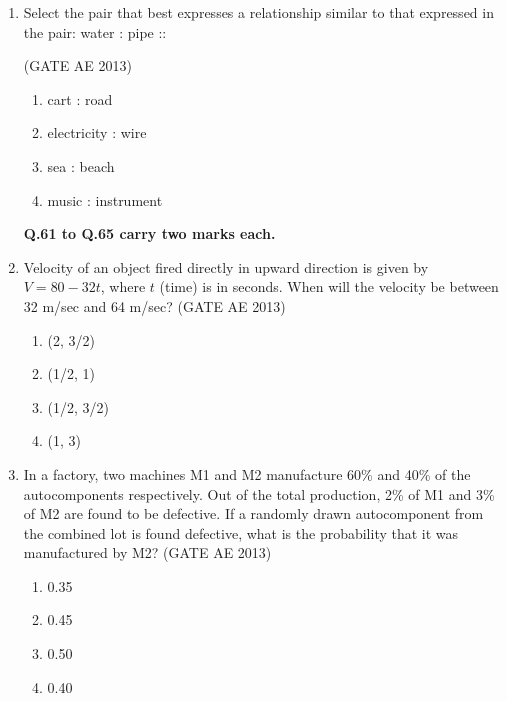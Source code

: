 \documentclass[journal,12pt,onecolumn]{IEEEtran}
\theoremstyle{remark}
\begin{document}
\begin{flushleft}
\begin{enumerate}
Which of the above underlined parts of the sentence is not appropriate? \hfill(GATE AE 2013)
\begin{multicols}{2}
\begin{enumerate}
\item I
\item II
\item III
\item IV
\end{enumerate}
\end{multicols}

\item Select the pair that best expresses a relationship similar to that expressed in the pair: 
\hspace{1cm} water : pipe ::

\hfill(GATE AE 2013)
\begin{multicols}{2}
\begin{enumerate}
\item cart : road
\item electricity : wire
\item sea : beach
\item music : instrument
\end{enumerate}
\end{multicols}

\textbf{Q.61 to Q.65 carry two marks each.}

\item Velocity of an object fired directly in upward direction is given by $V = 80 - 32t$, where $t$ (time) is in seconds. When will the velocity be between 32 m/sec and 64 m/sec? \hfill(GATE AE 2013)
\begin{multicols}{2}
\begin{enumerate}
\item (2, 3/2)
\item (1/2, 1)
\item (1/2, 3/2)
\item (1, 3)
\end{enumerate}
\end{multicols}

\item In a factory, two machines M1 and M2 manufacture 60\% and 40\% of the autocomponents respectively. Out of the total production, 2\% of M1 and 3\% of M2 are found to be defective. If a randomly drawn autocomponent from the combined lot is found defective, what is the probability that it was manufactured by M2? \hfill(GATE AE 2013)
\begin{multicols}{2}
\begin{enumerate}
\item 0.35
\item 0.45
\item 0.50
\item 0.40
\end{enumerate}
\end{multicols}


\end{enumerate}
\end{flushleft}
\end{document}
